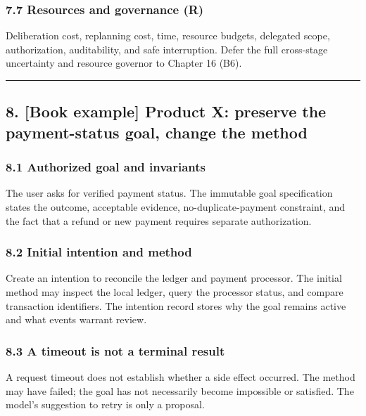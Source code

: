 \subsubsection{7.7 Resources and governance (R)}\label{resources-and-governance-r}

Deliberation cost, replanning cost, time, resource budgets, delegated scope, authorization, auditability, and safe interruption. Defer the full cross-stage uncertainty and resource governor to Chapter 16 (B6).

\begin{center}\rule{0.5\linewidth}{0.5pt}\end{center}

\subsection{8. {[}Book example{]} Product X: preserve the payment-status goal, change the method}\label{book-example-product-x-preserve-the-payment-status-goal-change-the-method}

\subsubsection{8.1 Authorized goal and invariants}\label{authorized-goal-and-invariants}

The user asks for verified payment status. The immutable goal specification states the outcome, acceptable evidence, no-duplicate-payment constraint, and the fact that a refund or new payment requires separate authorization.

\subsubsection{8.2 Initial intention and method}\label{initial-intention-and-method}

Create an intention to reconcile the ledger and payment processor. The initial method may inspect the local ledger, query the processor status, and compare transaction identifiers. The intention record stores why the goal remains active and what events warrant review.

\subsubsection{8.3 A timeout is not a terminal result}\label{a-timeout-is-not-a-terminal-result}

A request timeout does not establish whether a side effect occurred. The method may have failed; the goal has not necessarily become impossible or satisfied. The model's suggestion to retry is only a proposal.


